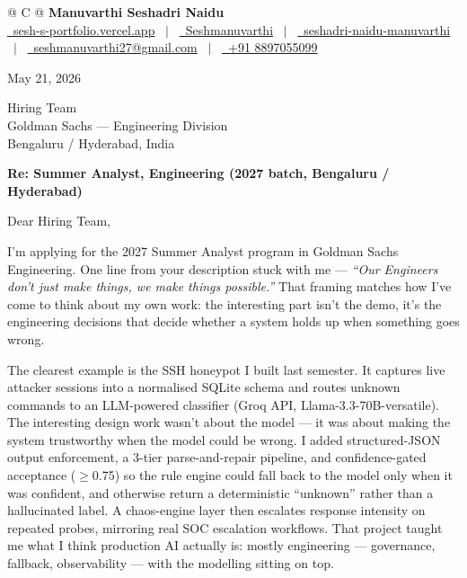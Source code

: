 \documentclass[a4paper,11pt]{article}
\begin{document}
\pagestyle{empty}

\begin{tabularx}{\linewidth}{@{} C @{}}
{\Large \textbf{Manuvarthi Seshadri Naidu}} \\[4pt]
\href{https://sesh-s-portfolio.vercel.app}{\raisebox{-0.05\height}\faGlobe\ sesh-s-portfolio.vercel.app} \ $|$ \
\href{https://github.com/Seshmanuvarthi}{\raisebox{-0.05\height}\faGithub\ Seshmanuvarthi} \ $|$ \
\href{https://www.linkedin.com/in/seshadri-naidu-manuvarthi-366466295/}{\raisebox{-0.05\height}\faLinkedin\ seshadri-naidu-manuvarthi} \ $|$ \
\href{mailto:seshmanuvarthi27@gmail.com}{\raisebox{-0.05\height}\faEnvelope\ seshmanuvarthi27@gmail.com} \ $|$ \
\href{tel:+918897055099}{\raisebox{-0.05\height}\faMobile\ +91 8897055099} \\
\end{tabularx}

\vspace{14pt}

\noindent May 21, 2026

\vspace{4pt}

\noindent Hiring Team \\
Goldman Sachs --- Engineering Division \\
Bengaluru / Hyderabad, India

\vspace{6pt}

\noindent \textbf{Re: Summer Analyst, Engineering (2027 batch, Bengaluru / Hyderabad)}

\vspace{8pt}

Dear Hiring Team,

I'm applying for the 2027 Summer Analyst program in Goldman Sachs Engineering. One line from your description stuck with me --- \textit{``Our Engineers don't just make things, we make things possible.''} That framing matches how I've come to think about my own work: the interesting part isn't the demo, it's the engineering decisions that decide whether a system holds up when something goes wrong.

The clearest example is the SSH honeypot I built last semester. It captures live attacker sessions into a normalised SQLite schema and routes unknown commands to an LLM-powered classifier (Groq API, Llama-3.3-70B-versatile). The interesting design work wasn't about the model --- it was about making the system trustworthy when the model could be wrong. I added structured-JSON output enforcement, a 3-tier parse-and-repair pipeline, and confidence-gated acceptance ($\geq$0.75) so the rule engine could fall back to the model only when it was confident, and otherwise return a deterministic ``unknown'' rather than a hallucinated label. A chaos-engine layer then escalates response intensity on repeated probes, mirroring real SOC escalation workflows. That project taught me what I think production AI actually is: mostly engineering --- governance, fallback, observability --- with the modelling sitting on top.
\end{document}

